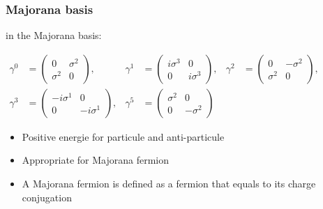 \begin{frame}[t]\frametitle{Majorana basis}
in the Majorana basis:\\

\newline
\begin{center}
	${\displaystyle {\begin{aligned}\gamma ^{0}&={\begin{pmatrix}0&\sigma ^{2}\\\sigma ^{2}&0\end{pmatrix}},&\gamma ^{1}&={\begin{pmatrix}i\sigma ^{3}&0\\0&i\sigma ^{3}\end{pmatrix}},&\gamma ^{2}&={\begin{pmatrix}0&-\sigma ^{2}\\\sigma ^{2}&0\end{pmatrix}},\\\gamma ^{3}&={\begin{pmatrix}-i\sigma ^{1}&0\\0&-i\sigma ^{1}\end{pmatrix}},&\gamma ^{5}&={\begin{pmatrix}\sigma ^{2}&0\\0&-\sigma ^{2}\end{pmatrix}}\end{aligned}}}$
\end{center}
\newline

\begin{itemize}
 \item  Positive energie for particule and anti-particule
 \item  Appropriate for Majorana fermion  
\item  A Majorana fermion is defined as a fermion that equals to its charge conjugation
\end{itemize}

\end{frame}
